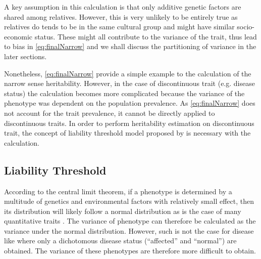 	A key assumption in this calculation is that only additive genetic factors are shared among relatives.
	However, this is very unlikely to be entirely true as relatives do tends to be in the same cultural group and might have similar socio-economic status.
	These might all contribute to the variance of the trait, thus lead to bias in \cref{eq:finalNarrow} and we shall discuss the partitioning of variance in the later sections.
	
	Nonetheless, \cref{eq:finalNarrow} provide a simple example to the calculation of the narrow sense heritability.
	However, in the case of discontinuous trait (e.g. disease status) the calculation becomes more complicated because the variance of the phenotype was dependent on the population prevalence.
	As \cref{eq:finalNarrow} does not account for the trait prevalence, it cannot be directly applied to discontinuous traits.
	In order to perform heritability estimation on discontinuous trait, the concept of liability threshold model proposed by \cite{Falconer1965} is necessary with the calculation.
	
	\subsection{Liability Threshold}
	\label{sec:liability}
	According to the central limit theorem, if a phenotype is determined by a multitude of genetics and environmental factors with relatively small effect, then its distribution will likely follow a normal distribution as is the case of many quantitative traits \citep{Visscher2008}. %
	The variance of phenotype can therefore be calculated as the variance under the normal distribution.
	However, such is not the case for disease like  where only a dichotomous disease status (``affected'' and ``normal'') are obtained.
	The variance of these phenotypes are therefore more difficult to obtain.
	
